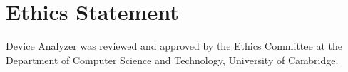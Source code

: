 \setcounter{secnumdepth}{0} %
\section{Ethics Statement}

Device Analyzer was reviewed and approved by the Ethics Committee at the Department of Computer Science and Technology, University of Cambridge.
